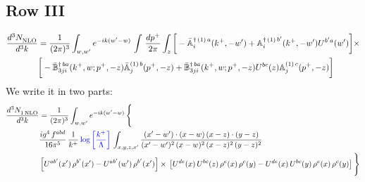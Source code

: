 \documentclass[9pt]{article}
\def\mf#1{\mathbb{#1}}
\numberwithin{equation}{section}
\begin{document}
\subsection{Row III}
\begin{align}
\frac{d^{3}N_{\rm NLO}^{\rm}}{d^{3}k}  & = \frac{1}{(2\pi)^{3}}  \int_{w, w^\prime} e^{-ik(w^\prime-w)}\, \int\,\frac{dp^{+}}{2\pi} \int_{z} \bigg[-\bar{\mf{A}}^{\dagger\,(1)\,a}_{i}(k^{+},-w^{\prime})+\mf{A}^{\dagger\, (1)\, b^{\prime}}_{i}(k^{+},-w^{\prime})U^{b^{\prime}a}(w^{\prime})\bigg]\times \notag \\ &  \bigg[-\Bar{\mf{B}}^{\dagger\, ba}_{3ji}(k^{+}, w; p^{+}, -z)\Bar{\mf{A}}^{(1)\,b}_{j}(p^{+}, - z)+ \Bar{\mf{B}}^{\dagger\, ba}_{3ji}(k^{+},w; p^{+},-z) U^{bc}(z) \mf{A}^{(1)\, c}_{j}(p^{+},- z)\bigg]\nonumber
\end{align}
We write it in two parts: 
\begin{align}
   \frac{d^{3}N_{1\,\rm NLO}^{\rm}}{d^{3}k}  & = \frac{1}{(2\pi)^{3}}  \int_{w, w^\prime} e^{-ik(w^\prime-w)}\, \Bigg\{\notag \\ & \frac{ig^{4}\,f^{abd}}{16\pi^{5}}\,\frac{1}{k^{+}}\,{\color{blue}\log{\left[\frac{k^{+}}{\Lambda}\right]}}\,\int_{x,y,z,x'} \frac{(x'-w')\cdot (x-w)\, (x-z)\cdot (y-z)}{(x'-w')^{2}\, (x-w)^{2}\, (x-z)^{2}\, (y-z)^{2}}\, \notag \\ & \left[U^{ab'}(x')\,\rho^{b'}(x')-U^{ab'}(w')\, \rho^{b'}(x')\right]\times\, \left[U^{de}(x)\,U^{bc}(z)\, \rho^{e}(x)\,\rho^{c}(y)-U^{de}(x)\,U^{bc}(y)\,\rho^{e}(x)\,\rho^{c}(y)\right]\Bigg\}
\end{align}
\end{document}
